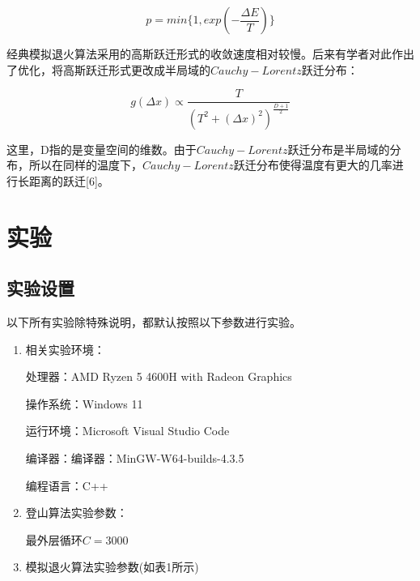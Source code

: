 \documentclass[UTF8]{ctexart}
\begin{document}
\begin{enumerate}
	\[p=min\{1,exp(-\frac{\Delta E}{T})\}\]
	
	经典模拟退火算法采用的高斯跃迁形式的收敛速度相对较慢。后来有学者对此作出了优化，将高斯跃迁形式更改成半局域的\(Cauchy-Lorentz\)跃迁分布：
	
	\[g(\Delta x)\propto \frac{T}{(T^2+(\Delta x)^2)^{\frac{D+1}{2}}}\]
	
	这里，D指的是变量空间的维数。由于\(Cauchy-Lorentz\)跃迁分布是半局域的分布，所以在同样的温度下，\(Cauchy-Lorentz\)跃迁分布使得温度有更大的几率进行长距离的跃迁{[}6{]}。
\end{enumerate}


	\section{实验}


	\subsection{实验设置}
以下所有实验除特殊说明，都默认按照以下参数进行实验。
\begin{enumerate}
	
	\def\labelenumi{\arabic{enumi}.}
	\item
	相关实验环境：
	
	处理器：AMD Ryzen 5 4600H with Radeon Graphics
	
	操作系统：Windows 11
	
	运行环境：Microsoft Visual Studio Code
	
	编译器：编译器：MinGW-W64-builds-4.3.5
	
	编程语言：C++
	\item
	登山算法实验参数：
	
	最外层循环\(C=3000\)
	\item
	模拟退火算法实验参数(如表1所示)
	
\end{enumerate}
\end{document}
